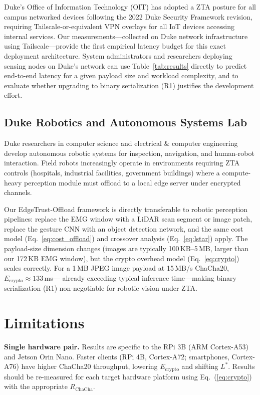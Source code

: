 \documentclass[10pt,twocolumn]{article}
\begin{document}
Duke's Office of Information Technology (OIT) has adopted a ZTA posture
for all campus networked devices following the 2022 Duke Security Framework
revision, requiring Tailscale-or-equivalent VPN overlays for all IoT devices
accessing internal services.  Our measurements—collected on Duke network
infrastructure using Tailscale—provide the first empirical latency budget for
this exact deployment architecture.  System administrators and researchers
deploying sensing nodes on Duke's network can use Table~\ref{tab:results}
directly to predict end-to-end latency for a given payload size and
workload complexity, and to evaluate whether upgrading to binary
serialization (R1) justifies the development effort.

\subsection{Duke Robotics and Autonomous Systems Lab}

Duke researchers in computer science and electrical \& computer engineering
develop autonomous robotic systems for inspection, navigation, and
human-robot interaction.  Field robots increasingly operate in environments
requiring ZTA controls (hospitals, industrial facilities, government
buildings) where a compute-heavy perception module must offload to a local
edge server under encrypted channels.

Our EdgeTrust-Offload framework is directly transferable to robotic
perception pipelines: replace the EMG window with a LiDAR scan segment
or image patch, replace the gesture CNN with an object detection network,
and the same cost model (Eq.~\ref{eq:cost_offload}) and crossover analysis
(Eq.~\ref{eq:lstar}) apply.  The payload-size dimension changes (images
are typically 100\,KB--5\,MB, larger than our 172\,KB EMG window), but the
crypto overhead model (Eq.~\ref{eq:crypto}) scales correctly.  For a 1\,MB
JPEG image payload at 15\,MB/s ChaCha20, $E_{\text{crypto}} \approx 133$\,ms—
already exceeding typical inference time—making binary serialization (R1)
non-negotiable for robotic vision under ZTA.

\section{Limitations}

\textbf{Single hardware pair.}  Results are specific to the RPi 3B (ARM
Cortex-A53) and Jetson Orin Nano.  Faster clients (RPi 4B, Cortex-A72;
smartphones, Cortex-A76) have higher ChaCha20 throughput, lowering
$E_{\text{crypto}}$ and shifting $L^*$.  Results should be re-measured
for each target hardware platform using Eq.~(\ref{eq:crypto}) with the
appropriate $R_{\text{ChaCha}}$.
\end{document}
